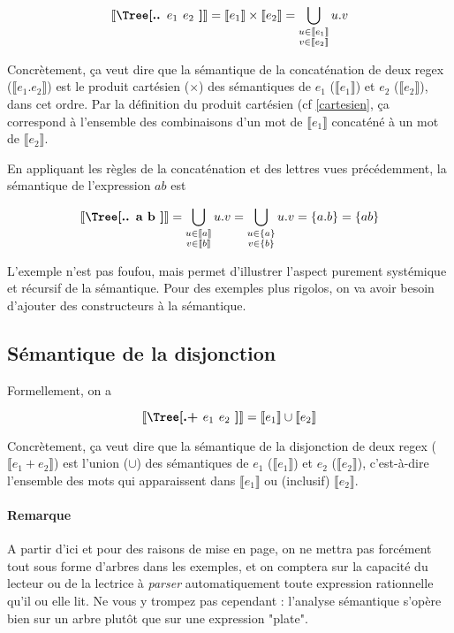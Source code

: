 \[\mt{\Tree[.{.} $e_1$ $e_2$ ]} = \llbracket e_1 \rrbracket \times \llbracket e_2 \rrbracket = \bigcup_{\substack{u \in \llbracket e_1 \rrbracket \\ v \in \llbracket e_2 \rrbracket}} u.v \]

Concrètement, ça veut dire que la sémantique de la concaténation de deux regex ($\llbracket e_1.e_2 \rrbracket$) est le produit cartésien ($\times$) des sémantiques de $e_1$ ($\llbracket e_1 \rrbracket$) et $e_2$ ($\llbracket e_2 \rrbracket$), dans cet ordre. Par la définition du produit cartésien (cf \ref{cartesien}, ça correspond à l'ensemble des combinaisons d'un mot de $\llbracket e_1 \rrbracket$ concaténé à un mot de $\llbracket e_2 \rrbracket$.


\begin{example}
En appliquant les règles de la concaténation et des lettres vues précédemment, la sémantique de l'expression $ab$ est 

\[\mt{\Tree[.{.} a b ]} = \bigcup_{\substack{u \in \llbracket a \rrbracket \\ v \in \llbracket b \rrbracket}} u.v = \bigcup_{\substack{u \in \{a\} \\ v \in \{b\}}} u.v = \{a.b\} = \{ab\}\]
\end{example}

L'exemple n'est pas foufou, mais permet d'illustrer l'aspect purement systémique et récursif de la sémantique. Pour des exemples plus rigolos, on va avoir besoin d'ajouter des constructeurs à la sémantique.

\subsection{Sémantique de la disjonction}

Formellement, on a 

\[\mt{\Tree[.{+} $e_1$ $e_2$ ]} = \llbracket e_1 \rrbracket \cup \llbracket e_2 \rrbracket \]

Concrètement, ça veut dire que la sémantique de la disjonction de deux regex ($\llbracket e_1 + e_2 \rrbracket$) est l'union ($\cup$) des sémantiques de $e_1$ ($\llbracket e_1 \rrbracket$) et $e_2$ ($\llbracket e_2 \rrbracket$), c'est-à-dire l'ensemble des mots qui apparaissent dans $\llbracket e_1 \rrbracket$ ou (inclusif) $\llbracket e_2 \rrbracket$.

\paragraph*{Remarque} A partir d'ici et pour des raisons de mise en page, on ne mettra pas forcément tout sous forme d'arbres dans les exemples, et on comptera sur la capacité du lecteur ou de la lectrice à \textit{parser} automatiquement toute expression rationnelle qu'il ou elle lit. Ne vous y trompez pas cependant : l'analyse sémantique s'opère bien sur un arbre plutôt que sur une expression "plate". 

